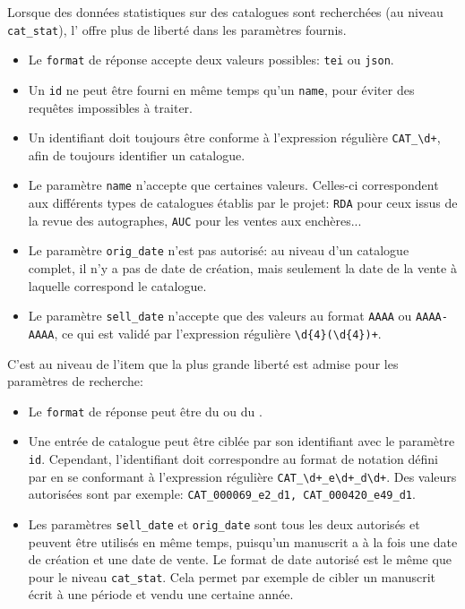Lorsque des données statistiques sur des catalogues sont recherchées (au niveau \texttt{cat\_stat}), l'\api{} offre plus de liberté dans les paramètres fournis.
\begin{itemize}
	\item Le \texttt{format} de réponse accepte deux valeurs possibles: \texttt{tei} ou \texttt{json}.
	\item Un \texttt{id} ne peut être fourni en même temps qu'un \texttt{name}, pour éviter des requêtes impossibles à traiter. 
	\item Un identifiant doit toujours être conforme à l'\gls{expression régulière} \texttt{CAT\_\textbackslash{}d+}, afin de toujours identifier un catalogue.
	\item Le paramètre \texttt{name} n'accepte que certaines valeurs. Celles-ci correspondent aux différents types de catalogues établis par le projet: \texttt{RDA} pour ceux issus de la revue des autographes, \texttt{AUC} pour les ventes aux enchères...
	\item Le paramètre \texttt{orig\_date} n'est pas autorisé: au niveau d'un catalogue complet, il n'y a pas de date de création, mais seulement la date de la vente à laquelle correspond le catalogue.
	\item Le paramètre \texttt{sell\_date} n'accepte que des valeurs au format \texttt{AAAA} ou \texttt{AAAA-AAAA}, ce qui est validé par l'\gls{expression régulière} \texttt{\textbackslash{}d\{4\}(\textbackslash{}d\{4\})+}.
\end{itemize}

C'est au niveau de l'item que la plus grande liberté est admise pour les paramètres de recherche:
\begin{itemize}
	\item Le \texttt{format} de réponse peut être du \xmltei{} ou du \json{}.
	\item Une entrée de catalogue peut être ciblée par son identifiant avec le paramètre \texttt{id}. Cependant, l'identifiant doit correspondre au format de notation défini par \mssktb{} en se conformant à l'expression régulière \texttt{CAT\_\textbackslash{}d+\_e\textbackslash{}d+\_d\textbackslash{}d+}. Des valeurs autorisées sont par exemple: \texttt{CAT\_000069\_e2\_d1, CAT\_000420\_e49\_d1}.
	\item Les paramètres \texttt{sell\_date} et \texttt{orig\_date} sont tous les deux autorisés et peuvent être utilisés en même temps, puisqu'un manuscrit a à la fois une date de création et une date de vente. Le format de date autorisé est le même que pour le niveau \texttt{cat\_stat}. Cela permet par exemple de cibler un manuscrit écrit à une période et vendu une certaine année.
\end{itemize}

